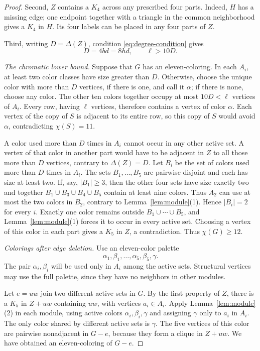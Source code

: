 \documentclass[11pt]{article}
\numberwithin{equation}{section}
\begin{document}
\begin{proof}
Second, \(Z\) contains a \(K_4\) across any prescribed four
parts. Indeed, \(H\) has a missing edge; one endpoint together
with a triangle in the common neighborhood gives a \(K_4\) in
\(H\). Its four labels can be placed in any four parts of \(Z\).

Third, writing \(D=\Delta(Z)\), condition \eqref{eq:degree-condition} gives
\begin{equation}\label{eq:D}
 D=4bd=8hd,\qquad \ell>10D.
\end{equation}

\smallskip
\noindent\emph{The chromatic lower bound.}
Suppose that \(G\) has an eleven-coloring. In each \(A_i\),
at least two color classes have size greater than \(D\).
Otherwise, choose the unique color with more than \(D\) vertices,
if there is one, and call it \(\alpha\); if there is none,
choose any color. The other ten colors together occupy at most
\(10D<\ell\) vertices of \(A_i\). Every row, having \(\ell\)
vertices, therefore contains a vertex of color \(\alpha\).
Each vertex of the copy of \(S\) is adjacent to its entire row,
so this copy of \(S\) would avoid \(\alpha\), contradicting
\(\chi(S)=11\).

A color used more than \(D\) times in \(A_i\) cannot occur in
any other active set. A vertex of that color in another part
would have to be adjacent in \(Z\) to all those more than
\(D\) vertices, contrary to \(\Delta(Z)=D\). Let \(B_i\) be the
set of colors used more than \(D\) times in \(A_i\). The sets
\(B_1,\ldots,B_5\) are pairwise disjoint and each has size at
least two. If, say, \(|B_1|\ge3\), then the other four sets have
size exactly two and together \(B_1\cup B_3\cup B_4\cup B_5\)
contain at least nine colors. Thus \(A_2\) can use at most the
two colors in \(B_2\), contrary to Lemma~\ref{lem:module}(1).
Hence \(|B_i|=2\) for every \(i\). Exactly one color remains
outside \(B_1\cup\cdots\cup B_5\), and Lemma~\ref{lem:module}(1)
forces it to occur in every active set. Choosing a vertex of
this color in each part gives a \(K_5\) in \(Z\), a contradiction.
Thus \(\chi(G)\ge12\).

\smallskip
\noindent\emph{Colorings after edge deletion.}
Use an eleven-color palette
\[
 \alpha_1,\beta_1,\ldots,\alpha_5,\beta_5,\gamma.
\]
The pair \(\alpha_i,\beta_i\) will be used only in \(A_i\)
among the active sets. Structural vertices may use the full
palette, since they have no neighbors in other modules.

Let \(e=uw\) join two different active sets in \(G\).
By the first property of \(Z\), there is a \(K_5\) in
\(Z+uw\) containing \(uw\), with vertices \(a_i\in A_i\).
Apply Lemma~\ref{lem:module}(2) in each module, using active
colors \(\alpha_i,\beta_i,\gamma\) and assigning \(\gamma\)
only to \(a_i\) in \(A_i\). The only color shared by different
active sets is \(\gamma\). The five vertices of this color are
pairwise nonadjacent in \(G-e\), because they form a clique in
\(Z+uw\). We have obtained an eleven-coloring of \(G-e\).


\end{proof}
\end{document}
